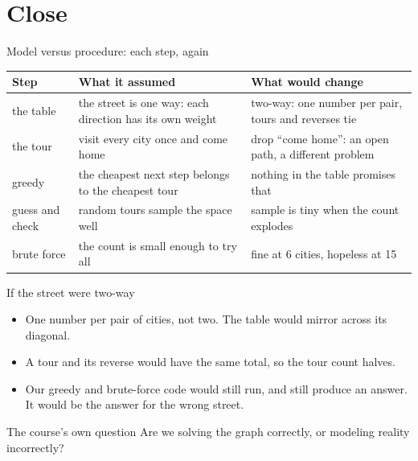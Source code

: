 \section{Close}
\begin{frame}{Model versus procedure: each step, again}
{\small
\begin{tabular}{@{}p{3.1cm}p{4.6cm}p{4.9cm}@{}}
\textbf{Step} & \textbf{What it assumed} & \textbf{What would change}\\\midrule
the table & the street is one way: each direction has its own weight & two-way: one number per pair, tours and reverses tie\\[2pt]
the tour & visit every city once and come home & drop ``come home'': an open path, a different problem\\[2pt]
greedy & the cheapest next step belongs to the cheapest tour & nothing in the table promises that\\[2pt]
guess and check & random tours sample the space well & sample is tiny when the count explodes\\[2pt]
brute force & the count is small enough to try all & fine at 6 cities, hopeless at 15
\end{tabular}}
\end{frame}

\begin{frame}{If the street were two-way}
\begin{itemize}
\item One number per pair of cities, not two. The table would mirror across its diagonal.
\item A tour and its reverse would have the same total, so the tour count halves.
\item Our greedy and brute-force code would still run, and still produce an answer. It would be the answer for the wrong street.
\end{itemize}
\vspace{4pt}
\begin{block}{The course's own question}
Are we solving the graph correctly, or modeling reality incorrectly?
\end{block}
\end{frame}

